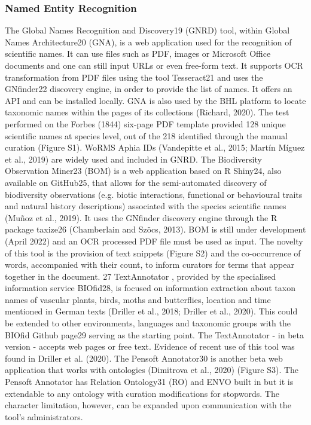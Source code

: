    \subsubsection{Named Entity Recognition}
   The Global Names Recognition and Discovery19 (GNRD) tool, within Global Names Architecture20 (GNA), is a web application used for the recognition of scientific names. It can use files such as PDF, images or Microsoft Office documents and one can still input URLs or even free-form text. It supports OCR transformation from PDF files using the tool Tesseract21 and uses the GNfinder22 discovery engine, in order to provide the list of names. It offers an API and can be installed locally. GNA is also used by the BHL platform to locate taxonomic names within the pages of its collections (Richard, 2020).
The test performed on the Forbes (1844) six-page PDF template provided 128 unique scientific names at species level, out of the 218 identified through the manual curation
(Figure S1). WoRMS Aphia IDs (Vandepitte et al., 2015; Martín Míguez et al., 2019) are widely used and included in GNRD.
The Biodiversity Observation Miner23 (BOM) is a web application based on R Shiny24, also available on GitHub25, that allows for the semi-automated discovery of biodiversity observations (e.g. biotic interactions, functional or behavioural traits and natural history descriptions) associated with the species scientific names (Muñoz et al., 2019). It uses the GNfinder discovery engine through the R package taxize26 (Chamberlain and Szöcs, 2013). BOM is still under development (April 2022) and an OCR processed PDF file must be used as input. The novelty of this tool is the provision of text snippets (Figure S2) and the co-occurrence of words, accompanied with their count, to inform curators for terms that appear together in the document. 27
TextAnnotator , provided by the specialised information service BIOfid28, is focused on information extraction about taxon names of vascular plants, birds, moths and butterflies, location and time mentioned in German texts (Driller et al., 2018; Driller et al., 2020). This could be extended to other environments, languages and taxonomic groups with the BIOfid Github page29 serving as the starting point. The TextAnnotator - in beta version - accepts web pages or free text. Evidence of recent use of this tool was found in Driller et al. (2020).
The Pensoft Annotator30 is another beta web application that works with ontologies (Dimitrova et al., 2020) (Figure S3). The Pensoft Annotator has Relation Ontology31 (RO) and ENVO built in but it is extendable to any ontology with curation modifications for stopwords. The character limitation, however, can be expanded upon communication with the tool’s administrators.
